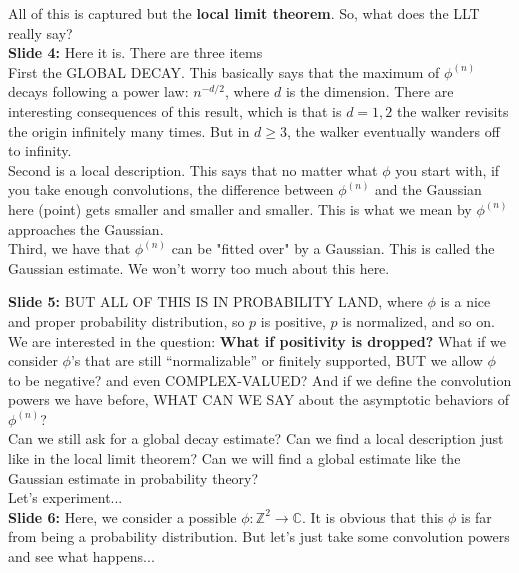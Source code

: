 \documentclass[11pt]{article}
\begin{document}
All of this is captured but the \textbf{local limit theorem}. So, what does the LLT really say? \\






\noindent \textbf{Slide 4:} Here it is. There are three items\\


First the GLOBAL DECAY. This basically says that the maximum of $\phi^{(n)}$ decays following a power law: $n^{-d/2}$, where $d$ is the dimension. There are interesting consequences of this result, which is that is $d=1,2$ the walker revisits the origin infinitely many times. But in $d\geq3$, the walker eventually wanders off to infinity. \\

Second is a local description. This says that no matter what $\phi$ you start with, if you take enough convolutions, the difference between $\phi^{(n)}$ and the Gaussian here (point) gets smaller and smaller and smaller. This is what we mean by $\phi^{(n)}$ approaches the Gaussian.\\

Third, we have that $\phi^{(n)}$ can be "fitted over" by a Gaussian. This is called the Gaussian estimate. We won't worry too much about this here. 


\newpage
 



\noindent \textbf{Slide 5:} BUT ALL OF THIS IS IN PROBABILITY LAND, where $\phi$ is a nice and proper probability distribution, so $p$ is positive, $p$ is normalized, and so on. \\

We are interested in the question: \textbf{What if positivity is dropped?} What if we consider $\phi$'s that are still ``normalizable'' or finitely supported, BUT we allow $\phi$ to be negative? and even COMPLEX-VALUED? And if we define the convolution powers we have before, WHAT CAN WE SAY about the asymptotic behaviors of $\phi^{(n)}$? \\

Can we still ask for a global decay estimate? Can we find a local description just like in the local limit theorem? Can we will find a global estimate like the Gaussian estimate in  probability theory? \\


Let's experiment...\\


\noindent \textbf{Slide 6:} Here, we consider a possible $\phi: \mathbb{Z}^2 \to \mathbb{C}$. It is obvious that this $\phi$ is far from being a probability distribution. But let's just take some convolution powers and see what happens...\\
\end{document}
